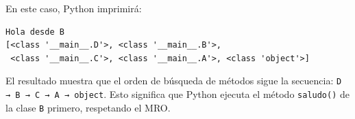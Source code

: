 \documentclass{article}
\begin{document}
En este caso, Python imprimirá:

\begin{verbatim}
Hola desde B
[<class '__main__.D'>, <class '__main__.B'>, 
 <class '__main__.C'>, <class '__main__.A'>, <class 'object'>]
\end{verbatim}

El resultado muestra que el orden de búsqueda de métodos sigue la secuencia:  
\texttt{D → B → C → A → object}.  
Esto significa que Python ejecuta el método \texttt{saludo()} de la clase \texttt{B} primero, respetando el MRO.

\centering
\end{document}
